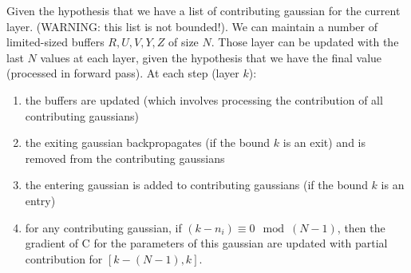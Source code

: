 \documentclass{article}
\begin{document}
Given the hypothesis that we have a list of contributing gaussian for the current layer. (WARNING: this list is not bounded!). 
We can maintain a number of limited-sized buffers $R, U, V, Y, Z$ of size $N$. Those layer can be updated with the last
$N$ values at each layer, given the hypothesis that we have the final value (processed in forward pass).
At each step (layer $k$):
\begin{enumerate}
    \item the buffers are updated (which involves processing the contribution of all contributing gaussians)
    \item the exiting gaussian backpropagates (if the bound $k$ is an exit) and is removed from the contributing gaussians
    \item the entering gaussian is added to contributing gaussians (if the bound $k$ is an entry)
    \item for any contributing gaussian, if $(k - n_i) \equiv 0 \mod (N - 1)$, then the gradient of C for the parameters of this gaussian are updated with partial contribution for $[k - (N - 1), k]$.
\end{enumerate}
\end{document}
